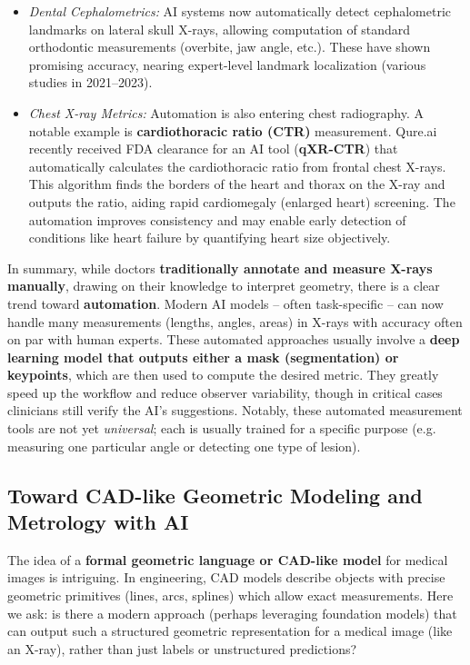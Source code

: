 \documentclass[
]{article}
\begin{document}
\begin{itemize}
  foot alignment evaluations compared to manual radiologist
  measurements\cite{key-32}.
\item
  \emph{Dental Cephalometrics:} AI systems now automatically detect
  cephalometric landmarks on lateral skull X-rays, allowing computation
  of standard orthodontic measurements (overbite, jaw angle, etc.).
  These have shown promising accuracy, nearing expert-level landmark
  localization\cite{key-33}
  (various studies in 2021--2023).
\item
  \emph{Chest X-ray Metrics:} Automation is also entering chest
  radiography. A notable example is \textbf{cardiothoracic ratio (CTR)}
  measurement. Qure.ai recently received FDA clearance for an AI tool
  (\textbf{qXR-CTR}) that automatically calculates the cardiothoracic
  ratio from frontal chest
  X-rays\cite{key-34}.
  This algorithm finds the borders of the heart and thorax on the X-ray
  and outputs the ratio, aiding rapid cardiomegaly (enlarged heart)
  screening\cite{key-35}\cite{key-36}.
  The automation improves consistency and may enable early detection of
  conditions like heart failure by quantifying heart size
  objectively\cite{key-37}.
\end{itemize}

In summary, while doctors \textbf{traditionally annotate and measure
X-rays manually}, drawing on their knowledge to interpret geometry,
there is a clear trend toward \textbf{automation}. Modern AI models --
often task-specific -- can now handle many measurements (lengths,
angles, areas) in X-rays with accuracy often on par with human experts.
These automated approaches usually involve a \textbf{deep learning model
that outputs either a mask (segmentation) or keypoints}, which are then
used to compute the desired metric. They greatly speed up the workflow
and reduce observer variability, though in critical cases clinicians
still verify the AI's suggestions. Notably, these automated measurement
tools are not yet \emph{universal}; each is usually trained for a
specific purpose (e.g. measuring one particular angle or detecting one
type of lesion).

\subsection{Toward CAD-like Geometric Modeling and Metrology with
AI}\label{toward-cad-like-geometric-modeling-and-metrology-with-ai}

The idea of a \textbf{formal geometric language or CAD-like model} for
medical images is intriguing. In engineering, CAD models describe
objects with precise geometric primitives (lines, arcs, splines) which
allow exact measurements. Here we ask: is there a modern approach
(perhaps leveraging foundation models) that can output such a structured
geometric representation for a medical image (like an X-ray), rather
than just labels or unstructured predictions?
\end{document}
